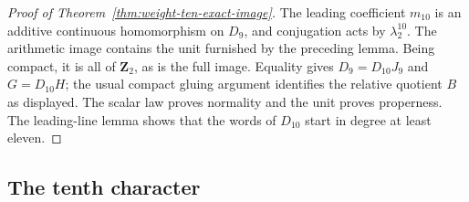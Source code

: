 \begin{proof}[Proof of Theorem~\ref{thm:weight-ten-exact-image}]
The leading coefficient $m_{10}$ is an additive continuous
homomorphism on $D_9$, and conjugation acts by
$\lambda_2^{10}$. The arithmetic image contains the unit furnished
by the preceding lemma. Being compact, it is all of
$\mathbf Z_2$, as is the full image. Equality gives
$D_9=D_{10}J_9$ and $G=D_{10}H$; the usual compact gluing argument
identifies the relative quotient $B$ as displayed. The scalar law
proves normality and the unit proves properness. The leading-line
lemma shows that the words of $D_{10}$ start in degree at least
eleven.
\end{proof}

\subsection{The tenth character}

